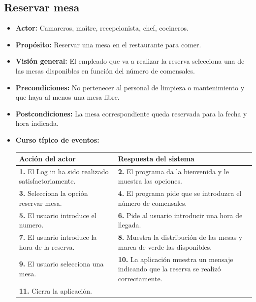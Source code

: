 \documentclass[spanish,a4paper,11pt, twoside]{report}	%
\begin{document}
		
		\subsection{Reservar mesa} 
			\begin{itemize}
			\item \textbf{Actor:} Camareros, maître, recepcionista, chef, cocineros.
			\item \textbf{Propósito:} Reservar una mesa en el restaurante para comer.
			\item \textbf{Visión general:} El empleado que va a realizar la reserva selecciona una de las mesas disponibles en función del número de comensales.
			\item \textbf{Precondiciones:} No pertenecer al personal de limpieza o mantenimiento y que haya al menos una mesa libre.
			\item \textbf{Postcondiciones:} La mesa correspondiente queda reservada para la fecha y hora indicada.
			\item \textbf{Curso típico de eventos:} 	\\
				\begin{tabular}{|p{6cm}||p{6cm}|}
				\hline
				\textbf{Acción del actor} & \textbf{Respuesta del sistema} \\ \hline \hline
				\textbf{1.}  El Log in ha sido realizado satisfactoriamente. & \textbf{2.} El programa da la bienvenida y le muestra las opciones. \\ \hline
				\textbf{3.} Selecciona la opción reservar mesa. & \textbf{4.} El programa pide que se introduzca el número de comensales. \\ \hline
				\textbf{5.} El usuario introduce el numero.	& \textbf{6.} Pide al usuario introducir una hora de llegada. \\ \hline
				\textbf{7.} El usuario introduce la hora de la reserva.	& \textbf{8.} Muestra la distribución de las mesas y marca de verde las disponibles. \\ \hline
				\textbf{9.} El usuario selecciona una mesa. & \textbf{10.} La aplicación muestra un mensaje indicando que la reserva se realizó correctamente. \\ \hline
				\textbf{11.} Cierra la aplicación. & \textbf{} \\ \hline
			\end{tabular}

\end{itemize}
\end{document}
